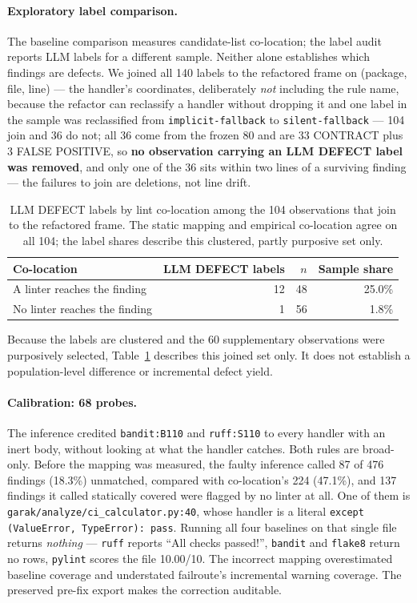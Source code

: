 \documentclass[10pt,a4paper]{article}
\begin{document}
\paragraph{Exploratory label comparison.}
The baseline comparison measures candidate-list co-location; the label audit reports LLM labels for a different
sample. Neither alone establishes which findings are defects. We joined all 140
labels to the refactored frame on (package, file, line) --- the handler's coordinates, deliberately \emph{not} including the rule name,
because the refactor can reclassify a handler without dropping it and one label in the
sample was reclassified from \texttt{implicit-fallback} to \texttt{silent-fallback} ---
104 join and 36 do not; all 36 come from the frozen 80 and are 33
CONTRACT plus 3 FALSE POSITIVE, so \textbf{no observation carrying an LLM DEFECT label was removed}, and only
one of the 36 sits within two lines of a surviving finding --- the failures to join
are deletions, not line drift.

\begin{table}[htbp]
\centering\small
\caption{LLM DEFECT labels by lint co-location among the 104 observations that
join to the refactored frame. The static mapping and empirical co-location agree
on all 104; the label shares describe this clustered, partly purposive set only.}
\label{tab:crosstab}
\begin{tabular}{@{}lrrr@{}}
\toprule
Co-location & LLM DEFECT labels & $n$ & Sample share \\
\midrule
A linter reaches the finding & 12 & 48 & 25.0\% \\
No linter reaches the finding & 1 & 56 & 1.8\% \\
\bottomrule
\end{tabular}
\end{table}

Because the labels are clustered and the 60 supplementary observations were
purposively selected, Table~\ref{tab:crosstab} describes this joined set only. It does not
establish a population-level difference or incremental defect yield.

\paragraph{Calibration: 68 probes.}
The inference credited \texttt{bandit:B110} and \texttt{ruff:S110} to every handler
with an inert body, without looking at what the handler catches. Both rules are
broad-only. Before the mapping was measured, the faulty
inference called 87 of 476 findings (18.3\%) unmatched, compared with co-location's 224 (47.1\%),
and 137 findings it called statically covered were flagged by no linter at all. One of
them is \texttt{garak/analyze/ci\_calculator.py:40}, whose handler is a literal
\texttt{except (ValueError, TypeError): pass}. Running all four baselines on that
single file returns \emph{nothing} --- \texttt{ruff} reports ``All checks passed!'',
\texttt{bandit} and \texttt{flake8} return no rows, \texttt{pylint} scores the file
10.00/10. The incorrect mapping overestimated baseline coverage and understated
failroute's incremental warning coverage. The preserved pre-fix export
makes the correction auditable.
\end{document}
